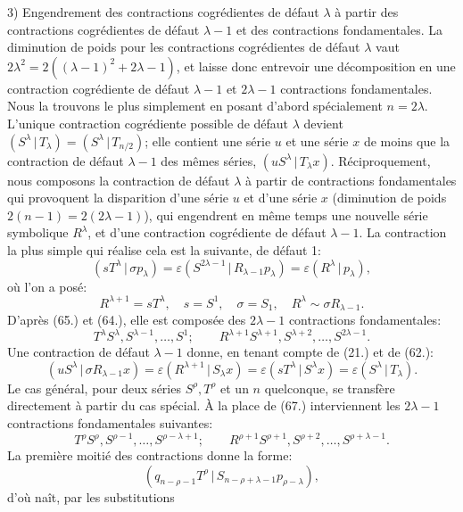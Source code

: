 \documentclass[11pt]{article}
\newcommand{\pair}[2]{(#1\,|\,#2)}
\newcommand{\eps}{\varepsilon}
\begin{document}
3) Engendrement des contractions cogrédientes de défaut $\lambda$ à partir des contractions cogrédientes de défaut $\lambda-1$ et des contractions fondamentales. La diminution de poids pour les contractions cogrédientes de défaut $\lambda$ vaut $2\lambda^2=2((\lambda-1)^2+2\lambda-1)$, et laisse donc entrevoir une décomposition en une contraction cogrédiente de défaut $\lambda-1$ et $2\lambda-1$ contractions fondamentales. Nous la trouvons le plus simplement en posant d'abord spécialement $n=2\lambda$. L'unique contraction cogrédiente possible de défaut $\lambda$ devient $\pair{S^\lambda}{T_\lambda}=\pair{S^\lambda}{T_{n/2}}$; elle contient une série $u$ et une série $x$ de moins que la contraction de défaut $\lambda-1$ des mêmes séries, $\pair{uS^\lambda}{T_\lambda x}$. Réciproquement, nous composons la contraction de défaut $\lambda$ à partir de contractions fondamentales qui provoquent la disparition d'une série $u$ et d'une série $x$ (diminution de poids $2(n-1)=2(2\lambda-1)$), qui engendrent en même temps une nouvelle série symbolique $R^\lambda$, et d'une contraction cogrédiente de défaut $\lambda-1$. La contraction la plus simple qui réalise cela est la suivante, de défaut 1:
\[
 \pair{sT^\lambda}{\sigma p_\lambda}=\eps\pair{S^{2\lambda-1}}{R_{\lambda-1}p_\lambda}=\eps\pair{R^\lambda}{p_\lambda},
\]
où l'on a posé:
\[
 R^{\lambda+1}=sT^\lambda,
 \quad s=S^1,
 \quad \sigma=S_1,
 \quad R^\lambda\sim\sigma R_{\lambda-1}.
\]
D'après (65.) et (64.), elle est composée des $2\lambda-1$ contractions fondamentales:
\begin{equation}
 T^\lambda S^\lambda,S^{\lambda-1},\ldots,S^1;
 \qquad R^{\lambda+1}S^{\lambda+1},S^{\lambda+2},\ldots,S^{2\lambda-1}.
\tag{67}
\end{equation}
Une contraction de défaut $\lambda-1$ donne, en tenant compte de (21.) et de (62.):
\[
 \pair{uS^\lambda}{\sigma R_{\lambda-1}x}=\eps\pair{R^{\lambda+1}}{S_\lambda x}
 =\eps\pair{sT^\lambda}{S^\lambda x}=\eps\pair{S^\lambda}{T_\lambda}.
\]
Le cas général, pour deux séries $S^\rho,T^\rho$ et un $n$ quelconque, se transfère directement à partir du cas spécial. À la place de (67.) interviennent les $2\lambda-1$ contractions fondamentales suivantes:
\begin{equation}
 T^\rho S^\rho,S^{\rho-1},\ldots,S^{\rho-\lambda+1};
 \qquad R^{\rho+1}S^{\rho+1},S^{\rho+2},\ldots,S^{\rho+\lambda-1}.
\tag{68}
\end{equation}
La première moitié des contractions donne la forme:
\[
 \pair{q_{n-\rho-1}T^\rho}{S_{n-\rho+\lambda-1}p_{\rho-\lambda}},
\]
d'où naît, par les substitutions
\end{document}
